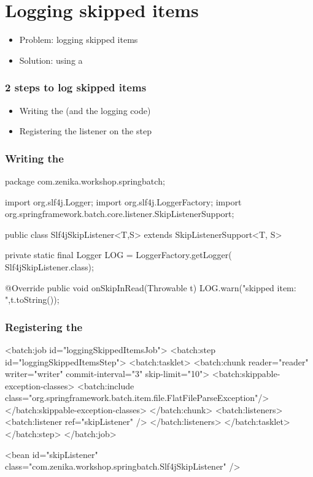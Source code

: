 \section{Logging skipped items}

\begin{frame}
 \begin{itemize}
  \item Problem: logging skipped items
  \item Solution: using a 
 \end{itemize}
\end{frame}

\begin{frame}
 \frametitle{2 steps to log skipped items}
 \begin{itemize}
  \item Writing the  (and the logging code)
  \item Registering the listener on the step  
 \end{itemize}
\end{frame}


\begin{frame}[fragile]
 \frametitle{Writing the }
 \begin{javacode}
package com.zenika.workshop.springbatch;

import org.slf4j.Logger;
import org.slf4j.LoggerFactory;
import org.springframework.batch.core.listener.SkipListenerSupport;

public class Slf4jSkipListener<T,S> extends SkipListenerSupport<T, S> {

  private static final Logger LOG = LoggerFactory.getLogger(
      Slf4jSkipListener.class);

  @Override
  public void onSkipInRead(Throwable t) {
    LOG.warn("skipped item: {}",t.toString());
  }

}  
 \end{javacode}

\end{frame}


\begin{frame}[fragile]
\frametitle{Registering the }
\begin{xmlcode}
<batch:job id="loggingSkippedItemsJob">
  <batch:step id="loggingSkippedItemsStep">
    <batch:tasklet>
      <batch:chunk reader="reader" writer="writer" commit-interval="3"
                   skip-limit="10">
        <batch:skippable-exception-classes>
          <batch:include
           class="org.springframework.batch.item.file.FlatFileParseException"/>
        </batch:skippable-exception-classes>
      </batch:chunk>
      <batch:listeners>
        <batch:listener ref="skipListener" />
      </batch:listeners>
    </batch:tasklet>
  </batch:step>
</batch:job>

<bean id="skipListener" class="com.zenika.workshop.springbatch.Slf4jSkipListener" />
\end{xmlcode}
\end{frame}

